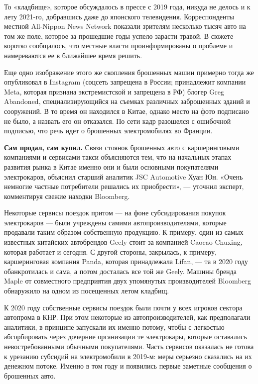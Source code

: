 То «кладбище», которое обсуждалось в прессе с 2019 года, никуда не делось и к лету 2021-го, добравшись даже до японского телевидения. Корреспонденты местной All-Nippon News Network показали зрителям несколько тысяч авто на том же поле, которое за прошедшие годы успело зарасти травой. В сюжете коротко сообщалось, что местные власти проинформированы о проблеме и намереваются ее в ближайшее время решить.

Еще одно изображение этого же скопления брошенных машин примерно тогда же опубликовал в Instagram (соцсеть запрещена в России; принадлежит компании Meta, которая признана экстремистской и запрещена в РФ) блогер Greg Abandoned, специализирующийся на съемках различных заброшенных зданий и сооружений. В то время он находился в Китае, однако место на фото подписано не было, а назвать его он отказался. По сети кадр разошелся с ошибочной подписью, что речь идет о брошенных электромобилях во Франции.

\textbf{Сам продал, сам купил.} Связи стоянок брошенных авто с каршеринговыми компаниями и сервисами такси объясняются тем, что на начальных этапах развития рынка в Китае именно они и были основными покупателями электрокаров, объяснил старший аналитик JSC Automotive Хуан Юн. «Очень немногие частные потребители решались их приобрести», — уточнил эксперт, комментируя свежие находки Bloomberg.

Некоторые сервисы поездок притом — на фоне субсидирования покупок электрокаров — были учреждены самими автопроизводителями, которые продавали таким образом собственную продукцию. К примеру, один из самых известных китайских автобрендов Geely стоит за компанией Caocao Chuxing, которая работает и сегодня. С другой стороны, закрылась, к примеру, каршеринговая компания Panda, которая принадлежала Lifan, — та в 2020 году обанкротилась и сама, а потом досталась все той же Geely. Машины бренда Maple от совместного предприятия двух упомянутых производителей Bloomberg обнаружило на одном из посещенных летом кладбищ.

К 2020 году собственные сервисы поездок были почти у всех игроков сектора автопрома в КНР. При этом некоторые из автопроизводителей, как предполагали аналитики, в принципе запускали их именно потому, чтобы с легкостью абсорбировать через дочерние организации те электрокары, которые оставались невостребованными обычными покупателями. Часть сервисов оказалась не готова к урезанию субсидий на электромобили в 2019-м: меры серьезно сказались на их денежном потоке. Именно в том году и появились первые заметные сообщения о брошенных авто.

